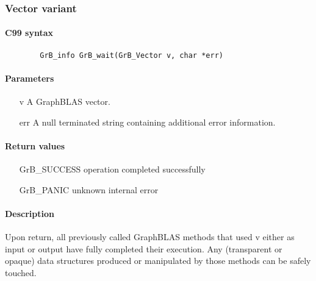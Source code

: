 {%

\subsubsection{Vector variant}

\paragraph{C99 syntax}

\begin{verbatim}
        GrB_info GrB_wait(GrB_Vector v, char *err)
\end{verbatim}

\paragraph{Parameters}

\begin{itemize}[leftmargin=1.1in]
	\item[{\sf v}]	     A GraphBLAS vector.
        \item[{\sf err}]     A null terminated string containing additional error
information.
\end{itemize}

\paragraph{Return values}
\begin{itemize}[leftmargin=2.1in]
\item[{\sf GrB\_SUCCESS}]	operation completed successfully
\item[{\sf GrB\_PANIC}]		unknown internal error
\end{itemize}

\paragraph{Description}

Upon return, all previously called GraphBLAS methods that used {\sf v} either as
input or output have fully completed their execution.  Any (transparent or opaque)
data structures produced or manipulated by those methods can be safely touched.
}